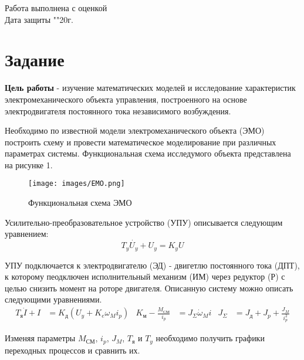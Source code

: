 \documentclass[a4paper, 12pt]{article}
\begin{document}
\begin{titlepage}
		Работа выполнена с оценкой \hspace{1cm} \underline{\hspace{8cm}} \\ 
		\vspace{1cm}
		Дата защиты "\underline{\hspace{0.7cm}}"\hspace{0.2cm}\underline{\hspace{2cm}}\hspace{0.2cm}20\underline{\hspace{0.7cm}}г.
		
	\end{titlepage}
	
	
	\section*{\centering Задание}
	\textbf{Цель работы} - изучение математических моделей и исследование характеристик электромеханического объекта управления, построенного на основе электродвигателя постоянного тока независимого возбуждения. \par
	Необходимо по известной модели электромеханического объекта (ЭМО) построить схему и провести математическое моделирование при различных параметрах системы. Функциональная схема исследумого объекта представлена на рисунке 1.
	\begin{figure} [h!]
		\centering
		\texttt{[image: images/EMO.png]}
		\caption{Функциональная схема ЭМО}
	\end{figure} \par
	Усилительно-преобразовательное устройство (УПУ) описывается следующим уравнением:
	\begin{equation}
	T_y\dot{U_y} + U_y = K_yU
	\end{equation} \par
	УПУ подключается к электродвигателю (ЭД) - двигетлю постоянного тока (ДПТ), к которому пеодключен исполнительный механизм (ИМ) через редуктор (Р) с целью снизить момент на роторе двигателя. Описанную систему можно описать следующими уравнениями.
	\begin{align}
	T_\text{я}\dot{I} + I & = K_\text{д}(U_y + K_e\omega_Mi_p) &
	K_\text{м} - \frac{M_\text{СМ}}{i_p} & = J_\Sigma\dot{\omega}_Mi &
	J_\Sigma & = J_\text{д} + J_p + \frac{J_M}{i_p^2}
	\end{align} \par
	Изменяя параметры $M_\text{СМ}$, $i_p$, $J_M$, $T_\text{я}$ и $T_y$ необходимо получить графики переходных процессов и сравнить их.
	
\end{document}
